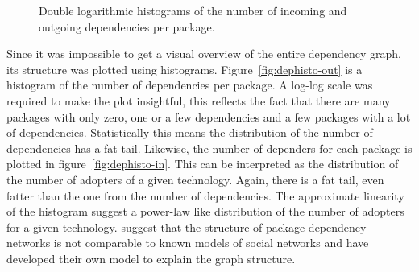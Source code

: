 \documentclass[smallextended,final]{svjour3}
\begin{document}
\begin{figure}
\small\centering
{}
\caption{Double logarithmic histograms of the number of incoming and outgoing dependencies per package.}
\end{figure}

Since it was impossible to get a visual overview of the entire dependency graph, its structure was plotted using histograms. Figure~\ref{fig:dephisto-out} is a histogram of the number of dependencies per package. A log-log scale was required to make the plot insightful, this reflects the fact that there are many packages with only zero, one or a few dependencies and a few packages with a lot of dependencies. Statistically this means the distribution of the number of dependencies has a fat tail. Likewise, the number of dependers for each package is plotted in figure~\ref{fig:dephisto-in}. This can be interpreted as the distribution of the number of adopters of a given technology. Again, there is a fat tail, even fatter than the one from the number of dependencies. The approximate linearity of the histogram suggest a power-law like distribution of the number of adopters for a given technology. \citet{zheng08} suggest that the structure of package dependency networks is not comparable to known models of social networks and have developed their own model to explain the graph structure.
\end{document}
